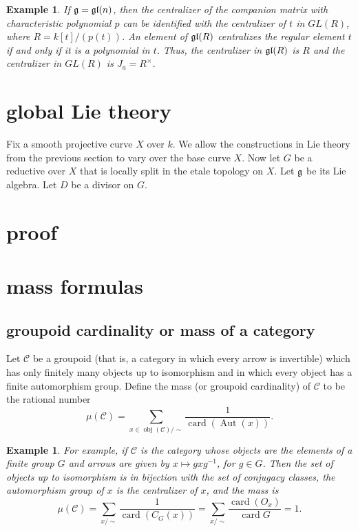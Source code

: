 \documentclass[brochure,english,12pt]{bourbaki}
\newtheorem{example}[equation]{Example}
\def\op#1{{\operatorname{#1}}}
\def\card{\op{card}}
\def\gl{\frak{gl}}
\def\g{\frak{g}}
\def\C{{\mathcal C}}
\begin{document}
\begin{example}
  If $\g=\gl(n)$, then the centralizer of the companion matrix with
  characteristic polynomial $p$ can be identified with the centralizer
  of $t$ in $GL(R)$, where $R=k[t]/(p(t))$.  An
  element of $\gl(R)$ centralizes the regular element $t$ if and only if it is a polynomial
  in $t$.  Thus, the centralizer in $\gl(R)$ is $R$ and the centralizer in $GL(R)$
 is $J_a = R^\times$.
\end{example}


\section{global Lie theory}


Fix a smooth projective curve $X$ over $k$.    We allow the constructions in Lie theory from
the previous section to vary over the base curve $X$.  Now let
 $G$ be a reductive over $X$ that is locally split in the etale topology on $X$.
Let $\g$ be its Lie algebra.  Let $D$ be a divisor on $G$.






\section{proof}


\section{mass formulas}

\subsection{groupoid cardinality or mass of a category}

Let ${\C}$ be a groupoid (that is, a category in which every arrow is
invertible) which has only finitely many objects up to isomorphism and
in which every object has a finite automorphism group.  Define the
mass (or groupoid cardinality) of $\C$  to be the rational
number
\[
\mu(\C)= \sum_{x\in \op{obj}(\C)/\sim} \frac{1}{\op{card}(\op{Aut}(x))}.
\]

\begin{example}
For example, if ${\C}$ is the category whose objects are the elements of a finite group $G$
and arrows are given by $x \mapsto g x g^{-1}$, for $g\in G$.  Then the set of objects up to
isomorphism is in bijection with the set of conjugacy classes, the automorphism group of $x$ is the
centralizer of $x$,  and the mass is
\[
\mu(\C) = \sum_{x/\sim} \frac{1}{\op{card}(C_G(x))} = 
\sum_{x/\sim} \frac{\op{card}(O_x)}{\card{G}} = 1.
\]
\end{example}
\end{document}

